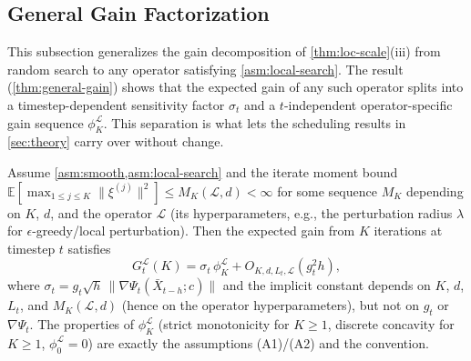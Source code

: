 \subsection{General Gain Factorization}
\label{sec:general-gain}
%
This subsection generalizes the gain decomposition of \cref{thm:loc-scale}\textup{(iii)} from random search to any operator satisfying \cref{asm:local-search}. The result (\cref{thm:general-gain}) shows that the expected gain of any such operator splits into a timestep-dependent sensitivity factor $\sigma_t$ and a $t$-independent operator-specific gain sequence $\phi_K^{\mathcal{L}}$. This separation is what lets the scheduling results in \cref{sec:theory} carry over without change.
%
\begin{theorem}
\label{thm:general-gain}
Assume \cref{asm:smooth,asm:local-search} and the iterate moment bound $\mathbb{E}[\max_{1\le j\le K}\|\xi^{(j)}\|^2] \le M_K(\mathcal{L}, d) < \infty$ for some sequence $M_K$ depending on $K$, $d$, and the operator $\mathcal{L}$ (its hyperparameters, e.g., the perturbation radius $\lambda$ for $\epsilon$-greedy/local perturbation).
Then the expected gain from $K$ iterations at timestep $t$ satisfies
\begin{equation}
  G_t^{\mathcal{L}}(K) = \sigma_t\,\phi_K^{\mathcal{L}} + O_{K,d,L_t,\mathcal{L}}(g_t^2 h),
  \label{eq:general-gain-factorization}
\end{equation}
where $\sigma_t = g_t\sqrt{h}\,\|\nabla\Psi_t(\bar{X}_{t-h};c)\|$ and the implicit constant depends on $K$, $d$, $L_t$, and $M_K(\mathcal{L}, d)$ (hence on the operator hyperparameters), but not on $g_t$ or $\nabla\Psi_t$. The properties of $\phi_K^{\mathcal{L}}$ (strict monotonicity for $K \ge 1$, discrete concavity for $K \ge 1$, $\phi_0^{\mathcal{L}} = 0$) are exactly the assumptions (A1)/(A2) and the convention.
\end{theorem}
%
